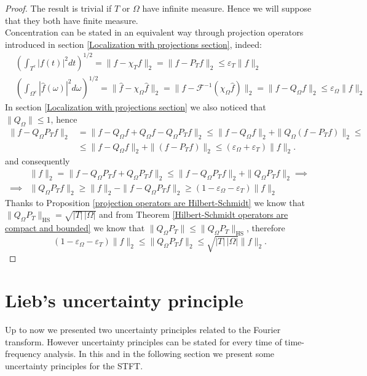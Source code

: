 \documentclass[corpo=11pt, stile=classica, tipotesi=custom,
greek, evenboxes, english]{toptesi}
\numberwithin{equation}{chapter}
\theoremstyle{remark}
\newcommand{\F}{\mathscr{F}} %
\begin{document}
\begin{proof}
	The result is trivial if $T$ or $\Omega$ have infinite measure. Hence we will suppose that they both have finite measure.\\
	Concentration can be stated in an equivalent way through projection operators introduced in section \ref{Localization with projections section}, indeed:
	\begin{align*}
		&\left( \int_{T^c} |f(t)|^2 dt\right)^{1/2} = \|f - \chi_T f\|_2  = \|f - P_T f\|_2 \leq \varepsilon_{T} \|f\|_2\\
		&\left( \int_{\Omega^c} |\hat{f}(\omega)|^2 d\omega\right)^{1/2} = \|\hat{f} - \chi_{\Omega} \hat{f} \|_2 = \|f - \F^{-1} (\chi_{\Omega} \hat{f}) \|_2 = \|f - Q_{\Omega}f \|_2 \leq \varepsilon_{\Omega} \|f\|_2
	\end{align*}
	In section \ref{Localization with projections section} we also noticed that $\|Q_{\Omega}\| \leq 1$, hence
	\begin{align*}
		\|f - Q_{\Omega}P_Tf \|_2 &= \|f - Q_{\Omega}f + Q_{\Omega}f - Q_{\Omega}P_T f \|_2 \leq \|f-Q_{\Omega}f \|_2 + \|Q_{\Omega}(f - P_T f) \|_2 \leq \\
								  &\leq \|f-Q_{\Omega}f \|_2 + \|(f - P_T f) \|_2 \leq (\varepsilon_{\Omega} + \varepsilon_T)\|f\|_2.
	\end{align*}
	and consequently
	\begin{align*}
		&\|f\|_2 = \|f - Q_{\Omega}P_T f + Q_{\Omega}P_T f \|_2 \leq \|f - Q_{\Omega}P_T f\|_2 + \| Q_{\Omega}P_T f  \|_2 \implies\\
		\implies &\|Q_{\Omega}P_T f \|_2 \geq \|f\|_2 - \|f - Q_{\Omega}P_T f\|_2 \geq (1-\varepsilon_{\Omega} - \varepsilon_T)\|f\|_2
	\end{align*}
	Thanks to Proposition \ref{projection operators are Hilbert-Schmidt} we know that $\| Q_{\Omega}P_T\|_{\mathrm{HS}} = \sqrt{|T| \, |\Omega|}$ and from Theorem \ref{Hilbert-Schmidt operators are compact and bounded} we know that $\|Q_{\Omega}P_T\| \leq \| Q_{\Omega}P_T\|_{\mathrm{HS}}$, therefore
	\begin{equation*}
		(1-\varepsilon_{\Omega} - \varepsilon_T)\|f\|_2 \leq \|Q_{\Omega}P_T f \|_2 \leq \sqrt{|T| \, |\Omega|} \|f\|_2.
	\end{equation*}
\end{proof}
\section{Lieb's uncertainty principle}\label{section Lieb's UP}
{\color{blue} Up to now we presented two uncertainty principles related to the Fourier transform}. {\color{red}However uncertainty principles can be stated for every time of time-frequency analysis}. {\color{blue}In this and in the following section we present some uncertainty principles for the STFT.}
\end{document}
